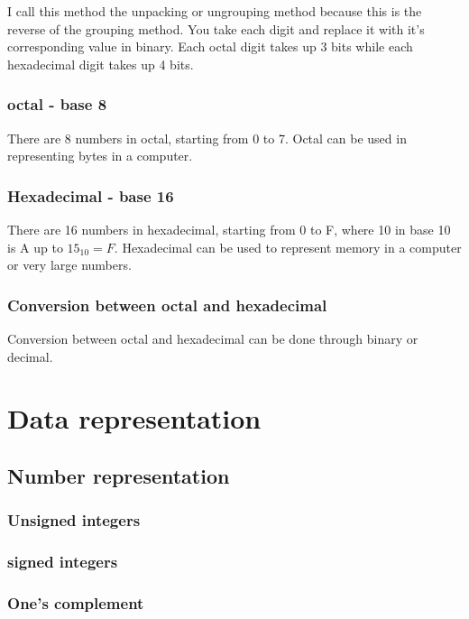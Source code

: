 \documentclass{ook}
\begin{document}
I call this method the unpacking or ungrouping method because this is the reverse of the grouping method. You take each digit and replace it with it's corresponding value in binary. Each octal digit takes up 3 bits while each hexadecimal digit takes up 4 bits.

\subsection{octal {-} base 8}

There are 8 numbers in octal, starting from 0 to 7. Octal can be used in representing bytes in a computer.

\subsection{Hexadecimal {-} base 16}

There are 16 numbers in hexadecimal, starting from 0 to F, where 10 in base 10 is A up to \({15}_{10} = F\). Hexadecimal can be used to represent memory in a computer or very large numbers.

\subsection{Conversion between octal and hexadecimal}
Conversion between octal and hexadecimal can be done through binary or decimal.

\chapter{Data representation}

\section{Number representation}

\subsection{Unsigned integers}

\subsection{signed integers}

\subsection{One's complement}
\end{document}
